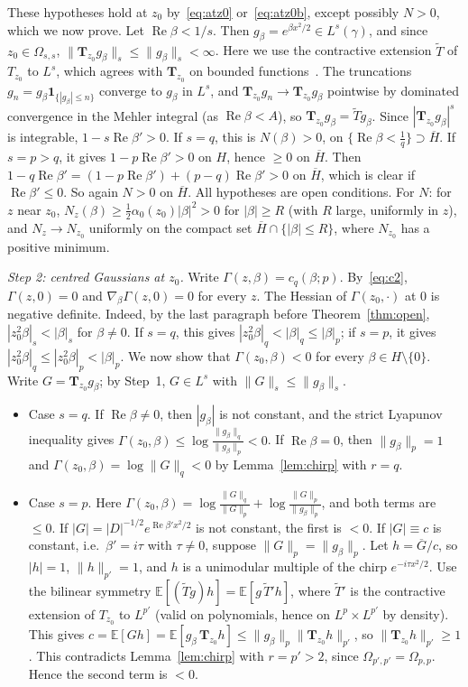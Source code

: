 \documentclass[11pt]{amsart}
\theoremstyle{definition}
\newcommand{\E}{\mathbb{E}}
\newcommand{\Rea}{\operatorname{Re}}
\newcommand{\bT}{\mathbf{T}}
\begin{document}
These hypotheses hold at $z_0$ by~\eqref{eq:atz0} or~\eqref{eq:atz0b}, except possibly $N>0$, which we now prove.
Let $\Rea\beta<1/s$. Then $g_\beta=e^{\beta x^2/2}\in L^s(\gamma)$, and since $z_0\in\Omega_{s,s}$,
$\|\bT_{z_0}g_\beta\|_s\le\|g_\beta\|_s<\infty$. Here we use the contractive extension $\widetilde T$ of $T_{z_0}$ to
$L^s$, which agrees with $\bT_{z_0}$ on bounded functions~\cite[proof of Thm.~1.1]{DCH}. The truncations
$g_n=g_\beta\mathbf 1_{\{|g_\beta|\le n\}}$ converge to $g_\beta$ in $L^s$, and $\bT_{z_0}g_n\to\bT_{z_0}g_\beta$ pointwise by
dominated convergence in the Mehler integral (as $\Rea\beta<A$), so $\bT_{z_0}g_\beta=\widetilde Tg_\beta$. Since
$|\bT_{z_0}g_\beta|^s$ is integrable, $1-s\Rea\beta'>0$. If $s=q$, this is $N(\beta)>0$, on
$\{\Rea\beta<\frac1q\}\supset\overline H$. If $s=p>q$, it gives $1-p\Rea\beta'>0$ on $H$, hence $\ge0$ on $\overline H$.
Then $1-q\Rea\beta'=(1-p\Rea\beta')+(p-q)\Rea\beta'>0$ on $\overline H$, which is clear if $\Rea\beta'\le0$. So again
$N>0$ on $\overline H$. All hypotheses are open conditions. For $N$: for $z$ near $z_0$,
$N_z(\beta)\ge\frac12\alpha_0(z_0)|\beta|^2>0$ for $|\beta|\ge R$ (with $R$ large, uniformly in $z$), and $N_z\to N_{z_0}$
uniformly on the compact set $\overline H\cap\{|\beta|\le R\}$, where $N_{z_0}$ has a positive minimum.

\emph{Step 2: centred Gaussians at $z_0$.} Write $\Gamma(z,\beta)=c_q(\beta;p)$. By~\eqref{eq:c2}, $\Gamma(z,0)=0$ and
$\nabla_\beta\Gamma(z,0)=0$ for every $z$. The Hessian of $\Gamma(z_0,\cdot)$ at $0$ is negative definite. Indeed, by
the last paragraph before Theorem~\ref{thm:open}, $|z_0^2\beta|_s<|\beta|_s$ for $\beta\ne0$. If $s=q$, this gives
$|z_0^2\beta|_q<|\beta|_q\le|\beta|_p$; if $s=p$, it gives $|z_0^2\beta|_q\le|z_0^2\beta|_p<|\beta|_p$. We now show
that $\Gamma(z_0,\beta)<0$ for every $\beta\in H\setminus\{0\}$. Write $G=\bT_{z_0}g_\beta$; by Step~1, $G\in L^s$
with $\|G\|_s\le\|g_\beta\|_s$.
\begin{itemize}[leftmargin=2em]
\item Case $s=q$. If $\Rea\beta\ne0$, then $|g_\beta|$ is not constant, and the strict Lyapunov inequality gives
$\Gamma(z_0,\beta)\le\log\frac{\|g_\beta\|_q}{\|g_\beta\|_p}<0$. If $\Rea\beta=0$, then $\|g_\beta\|_p=1$ and
$\Gamma(z_0,\beta)=\log\|G\|_q<0$ by Lemma~\ref{lem:chirp} with $r=q$.
\item Case $s=p$. Here $\Gamma(z_0,\beta)=\log\frac{\|G\|_q}{\|G\|_p}+\log\frac{\|G\|_p}{\|g_\beta\|_p}$, and both terms are
$\le0$. If $|G|=|D|^{-1/2}e^{\Rea\beta'x^2/2}$ is not constant, the first is $<0$. If $|G|\equiv c$ is constant,
i.e.\ $\beta'=i\tau$ with $\tau\ne0$, suppose $\|G\|_p=\|g_\beta\|_p$. Let $h=\overline G/c$, so $|h|=1$,
$\|h\|_{p'}=1$, and $h$ is a unimodular multiple of the chirp $e^{-i\tau x^2/2}$. Use the bilinear symmetry
$\E[(\widetilde Tg)h]=\E[g\,\widetilde T'h]$, where $\widetilde T'$ is the contractive extension of $T_{z_0}$ to
$L^{p'}$ (valid on polynomials, hence on $L^p\times L^{p'}$ by density). This gives
$c=\E[Gh]=\E[g_\beta\,\bT_{z_0}h]\le\|g_\beta\|_p\|\bT_{z_0}h\|_{p'}$, so $\|\bT_{z_0}h\|_{p'}\ge1$. This contradicts
Lemma~\ref{lem:chirp} with $r=p'>2$, since $\Omega_{p',p'}=\Omega_{p,p}$. Hence the second term is $<0$.
\end{itemize}
\end{document}
